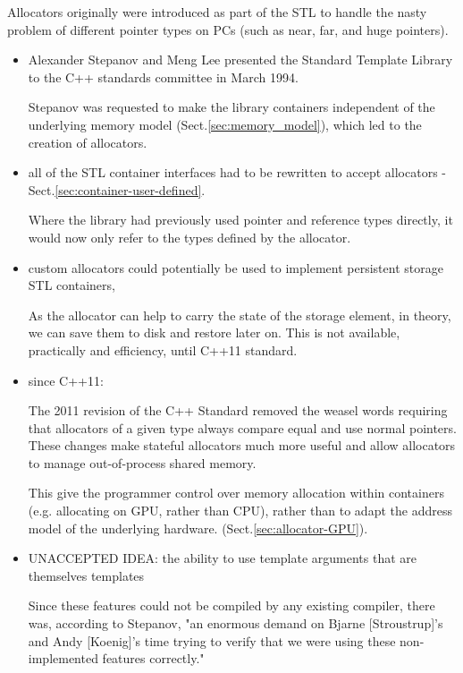 Allocators originally were introduced as part of the STL to handle the nasty
problem of different pointer types on PCs (such as near, far, and huge
pointers). 
\begin{itemize}

  \item  Alexander Stepanov and Meng Lee presented the Standard Template Library
  to the C++ standards committee in March 1994.

 Stepanov was requested to make the library containers independent of the
 underlying memory model (Sect.\ref{sec:memory_model}), which led to the
 creation of allocators.
 

  \item all of the STL container interfaces had to be rewritten to accept allocators - Sect.\ref{sec:container-user-defined}.
  
  Where the library had previously used pointer and reference types directly, it
  would now only refer to the types defined by the allocator.
  
  
  \item custom allocators could potentially be used to implement persistent storage STL containers,
  
  As the allocator can help to carry the state of the storage element, in theory, we can save them to disk and restore later on.
  This is not available, practically and efficiency, until C++11 standard.
  
  \item since C++11: 
  
The 2011 revision of the C++ Standard removed the weasel words requiring that
allocators of a given type always compare equal and use normal pointers. These
changes make stateful allocators much more useful and allow allocators to manage
out-of-process shared memory.

This give the programmer control over memory allocation within containers (e.g.
allocating on GPU, rather than CPU), rather than to adapt the address model of
the underlying hardware. (Sect.\ref{sec:allocator-GPU}).


  
  \item UNACCEPTED IDEA:
  the ability to use template arguments that are themselves templates
  
  Since these features could not be compiled by any existing compiler, there
  was, according to Stepanov, "an enormous demand on Bjarne [Stroustrup]'s and
  Andy [Koenig]'s time trying to verify that we were using these non-implemented
  features correctly."
  
  
\end{itemize}


